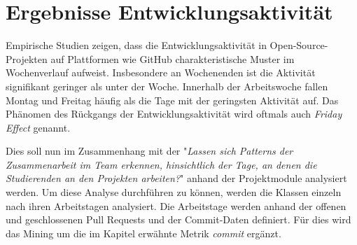 \newpage

\section{Ergebnisse Entwicklungsaktivität}
\label{sec:ErgebnisseEntwicklungsaktivtät}
Empirische Studien zeigen, dass die Entwicklungsaktivität in Open-Source-Projekten auf Plattformen wie GitHub charakteristische Muster im Wochenverlauf aufweist. Insbesondere an Wochenenden ist die Aktivität signifikant geringer als unter der Woche. Innerhalb der Arbeitswoche fallen Montag und Freitag häufig als die Tage mit der geringsten Aktivität auf. Das Phänomen des Rückgangs der Entwicklungsaktivität wird oftmals auch \textit{Friday Effect} genannt. \parencite{claes_programmers_2018}

Dies soll nun im Zusammenhang mit der  "\textit{Lassen sich Patterns der Zusammenarbeit im Team erkennen,
hinsichtlich der Tage, an denen die Studierenden an den Projekten arbeiten?}" anhand der Projektmodule analysiert werden. Um diese Analyse durchführen zu können, werden die Klassen einzeln nach ihren Arbeitstagen analysiert. Die Arbeitstage werden anhand der offenen und geschlossenen Pull Requests und der Commit-Daten definiert. Für dies wird das Mining um die im Kapitel  erwähnte Metrik \textit{commit} ergänzt.

